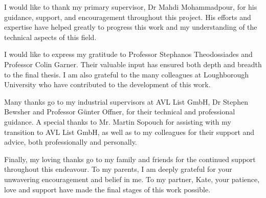
\begin{acknowledgements}      

I would like to thank my primary supervisor, Dr Mahdi Mohammadpour, for his guidance, support, and encouragement throughout this project. His efforts and expertise have helped greatly to progress this work and my understanding of the technical aspects of this field.

I would like to express my gratitude to Professor Stephanos Theodossiades and Professor Colin Garner. Their valuable input has ensured both depth and breadth to the final thesis. I am also grateful to the many colleagues at Loughborough University who have contributed to the development of this work.

Many thanks go to my industrial supervisors at AVL List GmbH, Dr Stephen Bewsher and Professor Günter Offner, for their technical and professional guidance. A special thanks to Mr. Martin Sopouch for assisting with my transition to AVL List GmbH, as well as to my colleagues for their support and advice, both professionally and personally. 

Finally, my loving thanks go to my family and friends for the continued support throughout this endeavour. To my parents, I am deeply grateful for your unwavering  encouragement and belief in me. To my partner, Kate, your patience, love and support have made the final stages of this work possible.

\end{acknowledgements}
